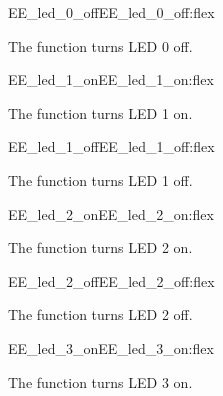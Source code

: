 \begin{function_nopb2}{EE\_led\_0\_off}{EE_led_0_off:flex}
  
  \begin{fundescription}
    The function turns LED 0 off.
  \end{fundescription}
\end{function_nopb2}

\begin{function_nopb2}{EE\_led\_1\_on}{EE_led_1_on:flex}
  
  \begin{fundescription}
    The function turns LED 1 on.
  \end{fundescription}
\end{function_nopb2}

\begin{function_nopb2}{EE\_led\_1\_off}{EE_led_1_off:flex}
  
  \begin{fundescription}
    The function turns LED 1 off.
  \end{fundescription}
\end{function_nopb2}

\begin{function_nopb2}{EE\_led\_2\_on}{EE_led_2_on:flex}
  
  \begin{fundescription}
    The function turns LED 2 on.
  \end{fundescription}
\end{function_nopb2}

\begin{function_nopb2}{EE\_led\_2\_off}{EE_led_2_off:flex}
  
  \begin{fundescription}
    The function turns LED 2 off.
  \end{fundescription}
\end{function_nopb2}

\begin{function_nopb2}{EE\_led\_3\_on}{EE_led_3_on:flex}
  
  \begin{fundescription}
    The function turns LED 3 on.
  \end{fundescription}
\end{function_nopb2}

